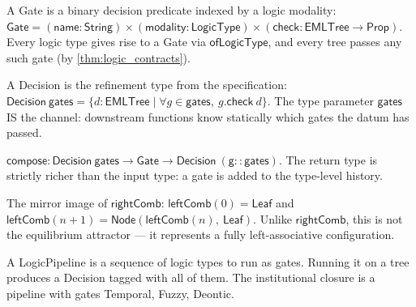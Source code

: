 \begin{definition}[Gate]
\label{def:gate}
\leanok
{}
A Gate is a binary decision predicate indexed by a logic modality:
$\mathsf{Gate} = (\mathsf{name} : \mathsf{String}) \times
(\mathsf{modality} : \mathsf{LogicType}) \times
(\mathsf{check} : \mathsf{EMLTree} \to \mathsf{Prop})$.
Every logic type gives rise to a Gate via $\mathsf{ofLogicType}$,
and every tree passes any such gate (by \ref{thm:logic_contracts}).
\end{definition}

\begin{definition}[Decision]
\label{def:decision}
\leanok
{}
A Decision is the refinement type from the specification:
$\mathsf{Decision\ gates} = \{ d : \mathsf{EMLTree} \mid
\forall g \in \mathsf{gates},\ g.\mathsf{check}\ d \}$.
The type parameter $\mathsf{gates}$ IS the channel: downstream
functions know statically which gates the datum has passed.
\end{definition}

\begin{definition}[Compose]
\label{def:compose}
\leanok
{}
$\mathsf{compose} : \mathsf{Decision\ gates} \to \mathsf{Gate}
\to \mathsf{Decision\ (g :: gates)}$.
The return type is strictly richer than the input type:
a gate is added to the type-level history.
\end{definition}

\begin{definition}
\label{def:leftComb}
\leanok
{}
The mirror image of $\mathsf{rightComb}$: $\mathsf{leftComb}(0) = \mathsf{Leaf}$ and $\mathsf{leftComb}(n+1) = \mathsf{Node}(\mathsf{leftComb}(n),\ \mathsf{Leaf})$.
Unlike $\mathsf{rightComb}$, this is not the equilibrium attractor — it represents a fully left-associative configuration.
\end{definition}

\begin{definition}[LogicPipeline]
\label{def:logic_pipeline}
\leanok
{}
A LogicPipeline is a sequence of logic types to run as gates.
Running it on a tree produces a Decision tagged with all of them.
The institutional closure is a pipeline with gates Temporal,
Fuzzy, Deontic.
\end{definition}

